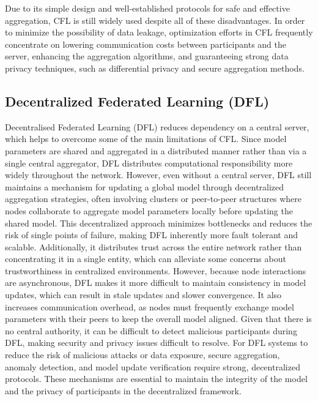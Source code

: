 Due to its simple design and well-established protocols for safe and effective aggregation, CFL is still widely used despite all of these disadvantages. In order to minimize the possibility of data leakage, optimization efforts in CFL frequently concentrate on lowering communication costs between participants and the server, enhancing the aggregation algorithms, and guaranteeing strong data privacy techniques, such as differential privacy and secure aggregation methods.

\subsection{Decentralized Federated Learning (DFL)}
\label{sub:decentralized_federated_learning}

Decentralised Federated Learning (DFL) reduces dependency on a central server, which helps to overcome some of the main limitations of CFL. Since model parameters are shared and aggregated in a distributed manner rather than via a single central aggregator, DFL distributes computational responsibility more widely throughout the network.
However, even without a central server, DFL still maintains a mechanism for updating a global model through decentralized aggregation strategies, often involving clusters or peer-to-peer structures where nodes collaborate to aggregate model parameters locally before updating the shared model.
This decentralized approach minimizes bottlenecks and reduces the risk of single points of failure, making DFL inherently more fault tolerant and scalable. Additionally, it distributes trust across the entire network rather than concentrating it in a single entity, which can alleviate some concerns about trustworthiness in centralized environments. However, because node interactions are asynchronous, DFL makes it more difficult to maintain consistency in model updates, which can result in stale updates and slower convergence. It also increases communication overhead, as nodes must frequently exchange model parameters with their peers to keep the overall model aligned.
Given that there is no central authority, it can be difficult to detect malicious participants during DFL, making security and privacy issues difficult to resolve. For DFL systems to reduce the risk of malicious attacks or data exposure, secure aggregation, anomaly detection, and model update verification require strong, decentralized protocols. These mechanisms are essential to maintain the integrity of the model and the privacy of participants in the decentralized framework. 


